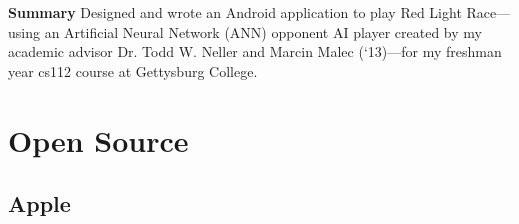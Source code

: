 \documentclass[]{article}
\begin{document}
\textbf{Summary}
Designed and wrote an Android application to play Red Light Race—using an Artificial Neural Network (ANN) opponent AI player created by my academic advisor Dr. Todd W. Neller and Marcin Malec (‘13)—for my freshman year cs112 course at Gettysburg College.\\

\newpage

\section*{Open Source}


\subsection*{Apple}

\end{document}
